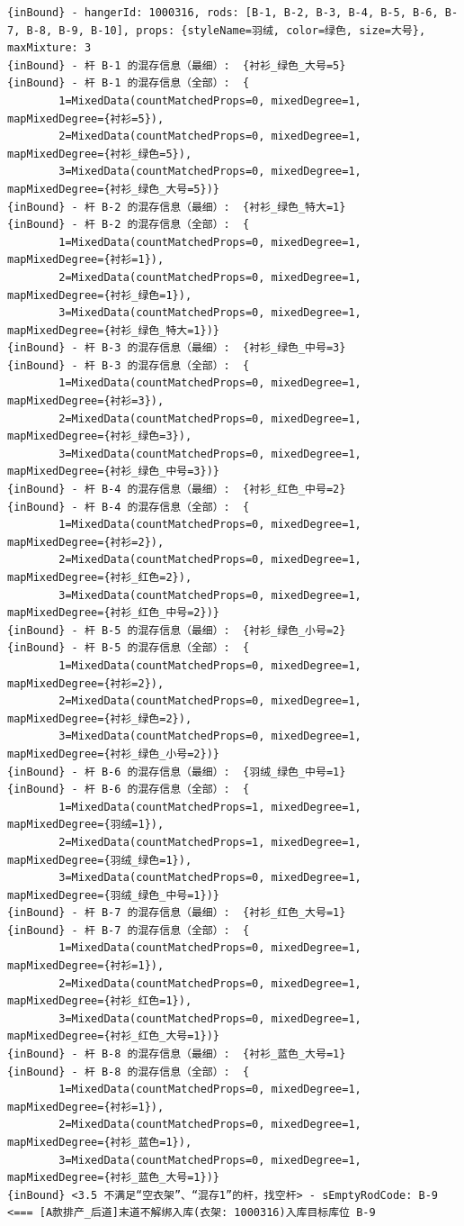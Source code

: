 {\begin{verbatim}
{inBound} - hangerId: 1000316, rods: [B-1, B-2, B-3, B-4, B-5, B-6, B-7, B-8, B-9, B-10], props: {styleName=羽绒, color=绿色, size=大号}, maxMixture: 3
{inBound} - 杆 B-1 的混存信息（最细）:  {衬衫_绿色_大号=5}
{inBound} - 杆 B-1 的混存信息（全部）:  {
		1=MixedData(countMatchedProps=0, mixedDegree=1, mapMixedDegree={衬衫=5}), 
		2=MixedData(countMatchedProps=0, mixedDegree=1, mapMixedDegree={衬衫_绿色=5}), 
		3=MixedData(countMatchedProps=0, mixedDegree=1, mapMixedDegree={衬衫_绿色_大号=5})}
{inBound} - 杆 B-2 的混存信息（最细）:  {衬衫_绿色_特大=1}
{inBound} - 杆 B-2 的混存信息（全部）:  {
		1=MixedData(countMatchedProps=0, mixedDegree=1, mapMixedDegree={衬衫=1}), 
		2=MixedData(countMatchedProps=0, mixedDegree=1, mapMixedDegree={衬衫_绿色=1}), 
		3=MixedData(countMatchedProps=0, mixedDegree=1, mapMixedDegree={衬衫_绿色_特大=1})}
{inBound} - 杆 B-3 的混存信息（最细）:  {衬衫_绿色_中号=3}
{inBound} - 杆 B-3 的混存信息（全部）:  {
		1=MixedData(countMatchedProps=0, mixedDegree=1, mapMixedDegree={衬衫=3}), 
		2=MixedData(countMatchedProps=0, mixedDegree=1, mapMixedDegree={衬衫_绿色=3}), 
		3=MixedData(countMatchedProps=0, mixedDegree=1, mapMixedDegree={衬衫_绿色_中号=3})}
{inBound} - 杆 B-4 的混存信息（最细）:  {衬衫_红色_中号=2}
{inBound} - 杆 B-4 的混存信息（全部）:  {
		1=MixedData(countMatchedProps=0, mixedDegree=1, mapMixedDegree={衬衫=2}), 
		2=MixedData(countMatchedProps=0, mixedDegree=1, mapMixedDegree={衬衫_红色=2}), 
		3=MixedData(countMatchedProps=0, mixedDegree=1, mapMixedDegree={衬衫_红色_中号=2})}
{inBound} - 杆 B-5 的混存信息（最细）:  {衬衫_绿色_小号=2}
{inBound} - 杆 B-5 的混存信息（全部）:  {
		1=MixedData(countMatchedProps=0, mixedDegree=1, mapMixedDegree={衬衫=2}), 
		2=MixedData(countMatchedProps=0, mixedDegree=1, mapMixedDegree={衬衫_绿色=2}), 
		3=MixedData(countMatchedProps=0, mixedDegree=1, mapMixedDegree={衬衫_绿色_小号=2})}
{inBound} - 杆 B-6 的混存信息（最细）:  {羽绒_绿色_中号=1}
{inBound} - 杆 B-6 的混存信息（全部）:  {
		1=MixedData(countMatchedProps=1, mixedDegree=1, mapMixedDegree={羽绒=1}), 
		2=MixedData(countMatchedProps=1, mixedDegree=1, mapMixedDegree={羽绒_绿色=1}), 
		3=MixedData(countMatchedProps=0, mixedDegree=1, mapMixedDegree={羽绒_绿色_中号=1})}
{inBound} - 杆 B-7 的混存信息（最细）:  {衬衫_红色_大号=1}
{inBound} - 杆 B-7 的混存信息（全部）:  {
		1=MixedData(countMatchedProps=0, mixedDegree=1, mapMixedDegree={衬衫=1}), 
		2=MixedData(countMatchedProps=0, mixedDegree=1, mapMixedDegree={衬衫_红色=1}), 
		3=MixedData(countMatchedProps=0, mixedDegree=1, mapMixedDegree={衬衫_红色_大号=1})}
{inBound} - 杆 B-8 的混存信息（最细）:  {衬衫_蓝色_大号=1}
{inBound} - 杆 B-8 的混存信息（全部）:  {
		1=MixedData(countMatchedProps=0, mixedDegree=1, mapMixedDegree={衬衫=1}), 
		2=MixedData(countMatchedProps=0, mixedDegree=1, mapMixedDegree={衬衫_蓝色=1}), 
		3=MixedData(countMatchedProps=0, mixedDegree=1, mapMixedDegree={衬衫_蓝色_大号=1})}
{inBound} <3.5 不满足“空衣架”、“混存1”的杆，找空杆> - sEmptyRodCode: B-9
<=== [A款排产_后道]末道不解绑入库(衣架: 1000316)入库目标库位 B-9


\end{verbatim}}
